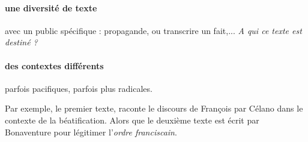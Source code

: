 \paragraph{une diversité de texte} avec un public spécifique : propagande, ou transcrire un fait,... \textit{A qui ce texte est destiné ?}

\paragraph{des contextes différents} parfois pacifiques, parfois plus radicales. 
\begin{Ex}
Par exemple, le premier texte, raconte le discours de François par Célano dans le contexte de la béatification. Alors que le deuxième texte est écrit par Bonaventure pour légitimer l'\textit{ordre franciscain}.
\end{Ex}


